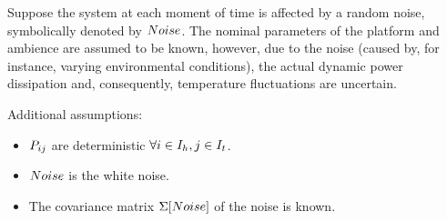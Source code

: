 Suppose the system at each moment of time is affected by a random noise, symbolically denoted by $Noise$. The nominal parameters of the platform and ambience are assumed to be known, however, due to the noise (caused by, for instance, varying environmental conditions), the actual dynamic power dissipation and, consequently, temperature fluctuations are uncertain.

Additional assumptions:
\begin{itemize}
  \item $P_{ij}$ are deterministic $\forall i \in I_h, j \in I_t$.
  \item $Noise$ is the white noise.
  \item The covariance matrix $\Sigma[Noise]$ of the noise is known.
\end{itemize}

